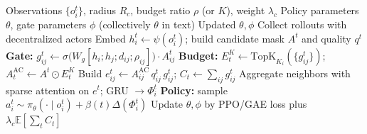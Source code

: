 \begin{algorithm}[t]
\caption{AC-DSGF Training}
\label{alg:ac-dsgf}
\begin{algorithmic}[1]
\REQUIRE Observations $\{o_i^{t}\}$, radius $R_c$, budget ratio $\rho$ (or $K$), weight $\lambda_c$
\REQUIRE Policy parameters $\theta$, gate parameters $\phi$ (collectively $\theta$ in text)
\ENSURE Updated $\theta,\phi$
  \STATE Collect rollouts with decentralized actors
    \STATE Embed $h_i^{t}\leftarrow\psi(o_i^{t})$; build candidate mask $A^{t}$ and quality $q^{t}$
    \STATE \textbf{Gate:} $g_{ij}^{t}\leftarrow\sigma\!\big(W_g[h_i;h_j;d_{ij};\rho_{ij}]\big)\cdot A_{ij}^{t}$
    \STATE \textbf{Budget:} $E_t^{K}\leftarrow\mathrm{TopK}_{K_i}(\{g_{ij}^{t}\})$;\;
          $A_t^{\mathrm{AC}}\leftarrow A^{t}\odot E_t^{K}$
    \STATE Build $e_{ij}^{t}\leftarrow A_{ij}^{\mathrm{AC}}\,q_{ij}^{t}\,g_{ij}^{t}$;\; $C_t\leftarrow\sum_{ij}g_{ij}^{t}$
    \STATE Aggregate neighbors with sparse attention on $e^{t}$; GRU $\rightarrow\Phi_i^{t}$
    \STATE \textbf{Policy:} sample $a_i^{t}\sim\pi_\theta(\cdot\mid o_i^{t})+\beta(t)\Delta(\Phi_i^{t})$
  \ENDFOR
  \STATE Update $\theta,\phi$ by PPO/GAE loss plus $\lambda_c\mathbb{E}[\sum_t C_t]$
\ENDFOR
\end{algorithmic}
\end{algorithm}

